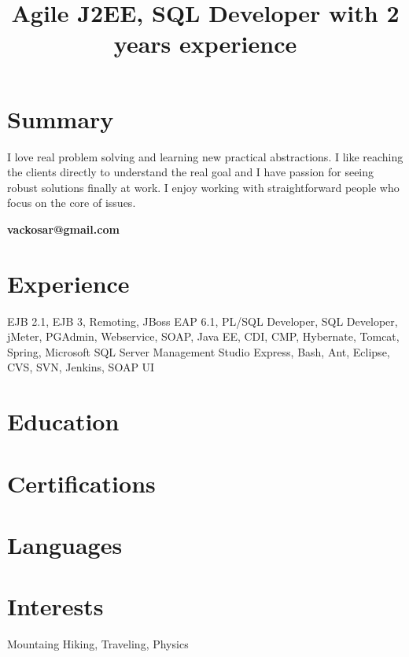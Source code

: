 \documentclass[11pt,a4paper,sans]{moderncv} %
\title{Agile J2EE, SQL Developer with 2 years experience}
\begin{document}
\makecvtitle %

\section{Summary}
I love real problem solving and learning new practical abstractions. I like reaching the clients directly to understand the real goal and I have passion for seeing robust solutions finally at work. I enjoy working with straightforward people who focus on the core of issues.
\begin{flushright} \textbf{vackosar@gmail.com} \end{flushright}


\section{Experience}
EJB 2.1, EJB 3, Remoting, JBoss EAP 6.1, PL/SQL Developer, SQL Developer, jMeter, PGAdmin, Webservice, SOAP, Java EE, CDI, CMP, Hybernate, Tomcat, Spring, Microsoft SQL Server Management Studio Express, Bash, Ant, Eclipse, CVS, SVN, Jenkins, SOAP UI\par
{}

\section{Education}


\section{Certifications}

\section{Languages}

\section{Interests}
Mountaing Hiking, Traveling, Physics


\end{document}
